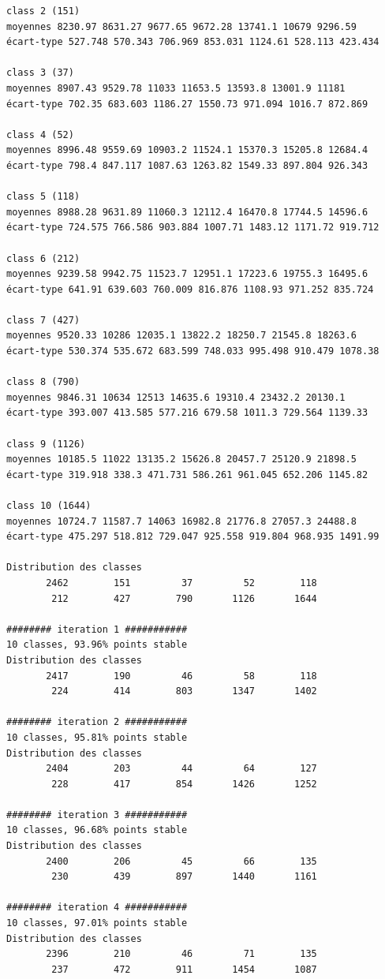 \documentclass[land,article,submit,pdftex,moreauthors]{Definitions/mdpi}
\begin{document}
\begin{scriptsize}
\begin{verbatim}
class 2 (151)
moyennes 8230.97 8631.27 9677.65 9672.28 13741.1 10679 9296.59
écart-type 527.748 570.343 706.969 853.031 1124.61 528.113 423.434

class 3 (37)
moyennes 8907.43 9529.78 11033 11653.5 13593.8 13001.9 11181
écart-type 702.35 683.603 1186.27 1550.73 971.094 1016.7 872.869

class 4 (52)
moyennes 8996.48 9559.69 10903.2 11524.1 15370.3 15205.8 12684.4
écart-type 798.4 847.117 1087.63 1263.82 1549.33 897.804 926.343

class 5 (118)
moyennes 8988.28 9631.89 11060.3 12112.4 16470.8 17744.5 14596.6
écart-type 724.575 766.586 903.884 1007.71 1483.12 1171.72 919.712

class 6 (212)
moyennes 9239.58 9942.75 11523.7 12951.1 17223.6 19755.3 16495.6
écart-type 641.91 639.603 760.009 816.876 1108.93 971.252 835.724

class 7 (427)
moyennes 9520.33 10286 12035.1 13822.2 18250.7 21545.8 18263.6
écart-type 530.374 535.672 683.599 748.033 995.498 910.479 1078.38

class 8 (790)
moyennes 9846.31 10634 12513 14635.6 19310.4 23432.2 20130.1
écart-type 393.007 413.585 577.216 679.58 1011.3 729.564 1139.33

class 9 (1126)
moyennes 10185.5 11022 13135.2 15626.8 20457.7 25120.9 21898.5
écart-type 319.918 338.3 471.731 586.261 961.045 652.206 1145.82

class 10 (1644)
moyennes 10724.7 11587.7 14063 16982.8 21776.8 27057.3 24488.8
écart-type 475.297 518.812 729.047 925.558 919.804 968.935 1491.99

Distribution des classes
       2462        151         37         52        118
        212        427        790       1126       1644

######## iteration 1 ###########
10 classes, 93.96% points stable
Distribution des classes
       2417        190         46         58        118
        224        414        803       1347       1402

######## iteration 2 ###########
10 classes, 95.81% points stable
Distribution des classes
       2404        203         44         64        127
        228        417        854       1426       1252

######## iteration 3 ###########
10 classes, 96.68% points stable
Distribution des classes
       2400        206         45         66        135
        230        439        897       1440       1161

######## iteration 4 ###########
10 classes, 97.01% points stable
Distribution des classes
       2396        210         46         71        135
        237        472        911       1454       1087


\end{verbatim}
\end{scriptsize}
\end{document}
